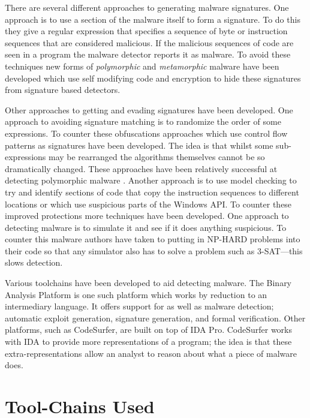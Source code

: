 \documentclass[10pt,]{book}
\begin{document}
There are several different approaches to generating malware signatures.
One approach is to use a section of the malware itself to form a
signature. To do this they give a regular expression that specifies a
sequence of byte or instruction sequences that are considered malicious.
If the malicious sequences of code are seen in a program the malware
detector reports it as malware. To avoid these techniques new forms of
\emph{polymorphic} and \emph{metamorphic} malware have been developed
which use self modifying code and encryption to hide these signatures
from signature based detectors\autocite{Christodorescu:2005vf}.

Other approaches to getting and evading signatures have been developed.
One approach to avoiding signature matching is to randomize the order of
some
expressions\autocite{Borello:2008vx}\autocite{Christodorescu:2005vf}. To
counter these obfuscations approaches which use control flow patterns as
signatures have been developed\autocite{Bonfante:2007th}. The idea is
that whilst some sub-expressions may be rearranged the algorithms
themselves cannot be so dramatically changed. These approaches have been
relatively successful at detecting polymorphic malware
\autocite{Kang:2011bs}\autocite{Bruschi:vb}. Another approach is to use
model checking to try and identify sections of code that copy the
instruction sequences to different locations or which use suspicious
parts of the Windows API\autocite{Kinder:2005hu}. To counter these
improved protections more techniques have been developed. One approach
to detecting malware is to simulate it and see if it does anything
suspicious. To counter this malware authors have taken to putting in
NP-HARD problems into their code so that any simulator also has to solve
a problem such as 3-SAT\autocite{Moser:2007cd}---this slows detection.

Various toolchains have been developed to aid detecting malware. The
Binary Analysis Platform\autocite{Brumley:wn} is one such platform which
works by reduction to an intermediary language. It offers support for as
well as malware detection; automatic exploit
generation\autocite{Avgerinos:vo}, signature generation, and formal
verification. Other platforms, such as
CodeSurfer\autocite{Balakrishnan:2005tx}, are built on top of IDA
Pro\autocite{HexRays:up}. CodeSurfer works with IDA to provide more
representations of a program; the idea is that these
extra-representations allow an analyst to reason about what a piece of
malware does.

\section{Tool-Chains Used}
\end{document}
